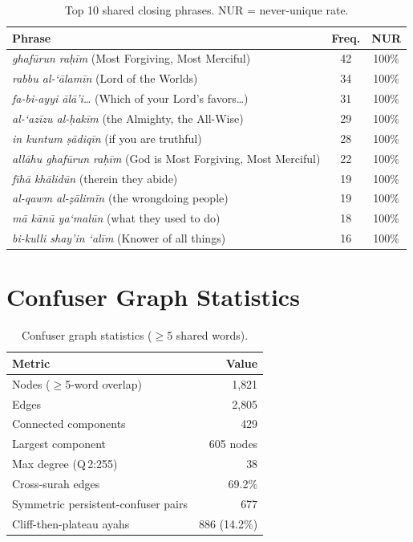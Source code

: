 \documentclass[11pt,a4paper]{article}
\begin{document}
\begin{table}[h]
\centering
\normalsize
\renewcommand{\arraystretch}{1.3}
\begin{tabular}{lcc}
\toprule
\textbf{Phrase} & \textbf{Freq.} & \textbf{NUR} \\
\midrule
\emph{ghaf\=urun ra\d{h}\=im} (Most Forgiving, Most Merciful) & 42 & 100\% \\
\emph{rabbu al-`\=alam\=in} (Lord of the Worlds) & 34 & 100\% \\
\emph{fa-bi-ayyi \=al\=a'i\ldots} (Which of your Lord's favors\ldots) & 31 & 100\% \\
\emph{al-`az\=izu al-\d{h}ak\=im} (the Almighty, the All-Wise) & 29 & 100\% \\
\emph{in kuntum \d{s}\=adiq\=in} (if you are truthful) & 28 & 100\% \\
\emph{all\=ahu ghaf\=urun ra\d{h}\=im} (God is Most Forgiving, Most Merciful) & 22 & 100\% \\
\emph{f\=ih\=a kh\=alid\=un} (therein they abide) & 19 & 100\% \\
\emph{al-qawm al-\d{z}\=alim\=in} (the wrongdoing people) & 19 & 100\% \\
\emph{m\=a k\=an\=u ya`mal\=un} (what they used to do) & 18 & 100\% \\
\emph{bi-kulli shay'in `al\=im} (Knower of all things) & 16 & 100\% \\
\bottomrule
\end{tabular}
\caption{Top 10 shared closing phrases. NUR = never-unique rate.}
\label{tab:phrases}
\end{table}

\section{Confuser Graph Statistics}
\label{app:graph}

\begin{table}[h]
\centering
\normalsize
\renewcommand{\arraystretch}{1.3}
\begin{tabular}{lr}
\toprule
\textbf{Metric} & \textbf{Value} \\
\midrule
Nodes ($\geq$5-word overlap) & 1{,}821 \\
Edges & 2{,}805 \\
Connected components & 429 \\
Largest component & 605 nodes \\
Max degree (Q\,2:255) & 38 \\
Cross-surah edges & 69.2\% \\
Symmetric persistent-confuser pairs & 677 \\
Cliff-then-plateau ayahs & 886 (14.2\%) \\
\bottomrule
\end{tabular}
\caption{Confuser graph statistics ($\geq$5 shared words).}
\label{tab:graph}
\end{table}
\end{document}
